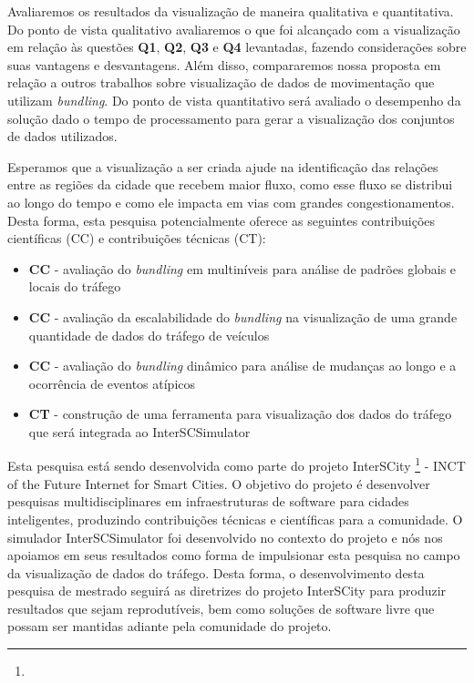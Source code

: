   Avaliaremos os resultados da visualização de maneira qualitativa e
quantitativa. Do ponto de vista qualitativo avaliaremos o que foi alcançado com
a visualização em relação às questões \textbf{Q1}, \textbf{Q2}, \textbf{Q3} e
\textbf{Q4} levantadas, fazendo considerações sobre suas vantagens e
desvantagens. Além disso, compararemos nossa proposta em relação a outros
trabalhos sobre visualização de dados de movimentação que utilizam
\emph{bundling}. Do ponto de vista quantitativo será avaliado o desempenho da
solução dado o tempo de processamento para gerar a visualização dos conjuntos
de dados utilizados.

  Esperamos que a visualização a ser criada ajude na identificação das relações
entre as regiões da cidade que recebem maior fluxo, como esse fluxo se
distribui ao longo do tempo e como ele impacta em vias com grandes
congestionamentos. Desta forma, esta pesquisa potencialmente oferece as
seguintes contribuições científicas (CC) e contribuições técnicas (CT):

\begin{itemize}
  \item \textbf{CC} - avaliação do \emph{bundling} em multiníveis para análise de
padrões globais e locais do tráfego

  \item \textbf{CC} - avaliação da escalabilidade do \emph{bundling} na visualização de uma grande
quantidade de dados do tráfego de veículos

  \item \textbf{CC} - avaliação do \emph{bundling} dinâmico para análise de mudanças ao longo
e a ocorrência de eventos atípicos

  \item \textbf{CT} - construção de uma ferramenta para visualização dos dados do tráfego
que será integrada ao InterSCSimulator
\end{itemize}

Esta pesquisa está sendo desenvolvida como parte do projeto InterSCity
\footnote{} - INCT of the Future Internet for Smart
Cities. O objetivo do projeto é desenvolver pesquisas multidisciplinares em
infraestruturas de software para cidades inteligentes, produzindo contribuições
técnicas e científicas para a comunidade. O simulador InterSCSimulator foi
desenvolvido no contexto do projeto e nós nos apoiamos em seus resultados como
forma de impulsionar esta pesquisa no campo da visualização de dados do
tráfego. Desta forma, o desenvolvimento desta pesquisa de mestrado seguirá as
diretrizes do projeto InterSCity para produzir resultados que sejam
reprodutíveis, bem como soluções de software livre que possam ser mantidas
adiante pela comunidade do projeto.

